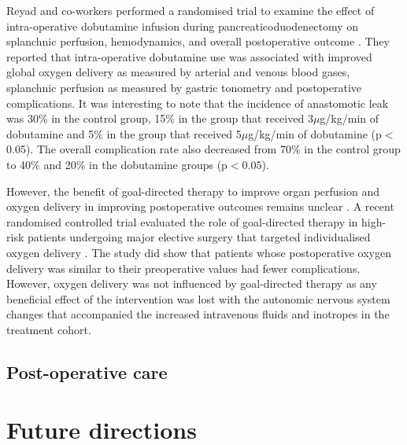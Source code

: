 Reyad and co-workers performed a randomised trial to examine the effect of intra-operative dobutamine infusion during pancreaticoduodenectomy on splanchnic perfusion, hemodynamics, and overall postoperative outcome \parencite{reyad_effect_2013}. 
They reported that intra-operative dobutamine use was associated with improved global oxygen delivery as measured by arterial and venous blood gases, splanchnic perfusion as measured by gastric tonometry and postoperative complications.
It was interesting to note that the incidence of anastomotic leak was 30\% in the control group, 15\% in the group that received 3$\mu$g/kg/min of dobutamine and 5\% in the group that received 5$\mu$g/kg/min of dobutamine (p$<$0.05). The overall complication rate also decreased from 70\% in the control group to 40\% and 20\% in the dobutamine groups (p$<0.05$).

However, the benefit of goal-directed therapy to improve organ perfusion and oxygen delivery in improving postoperative outcomes remains unclear \parencite{grocott_perioperative_2013, pearse_effect_2014}. 
A recent randomised controlled trial evaluated the role of goal-directed therapy in high-risk patients undergoing major elective surgery that targeted individualised oxygen delivery \parencite{ackland_individualised_2015}.
The study did show that patients whose postoperative oxygen delivery was similar to their preoperative values had fewer complications.
However, oxygen delivery was not influenced by goal-directed therapy as any beneficial effect of the intervention was lost with the autonomic nervous system changes that accompanied the increased intravenous fluids and inotropes in the treatment cohort.









\subsection{Post-operative care}


\section{Future directions}


